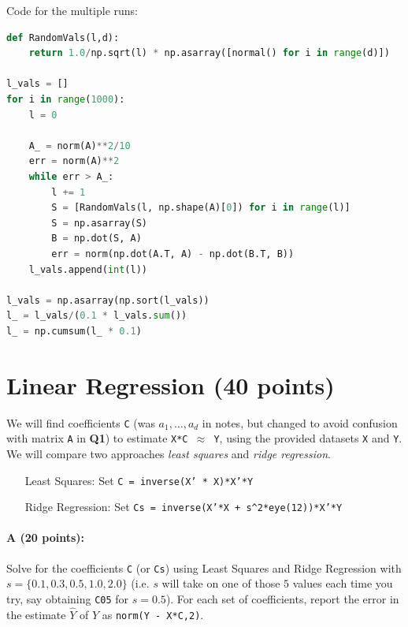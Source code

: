 \documentclass[11pt]{article}
\begin{document}
Code for the multiple runs: 

\begin{lstlisting}[language=Python]
def RandomVals(l,d):
    return 1.0/np.sqrt(l) * np.asarray([normal() for i in range(d)])

l_vals = []
for i in range(1000):
    l = 0

    A_ = norm(A)**2/10
    err = norm(A)**2
    while err > A_:
        l += 1
        S = [RandomVals(l, np.shape(A)[0]) for i in range(l)]    
        S = np.asarray(S)
        B = np.dot(S, A)
        err = norm(np.dot(A.T, A) - np.dot(B.T, B))
    l_vals.append(int(l))

l_vals = np.asarray(np.sort(l_vals))
l_ = l_vals/(0.1 * l_vals.sum())
l_ = np.cumsum(l_ * 0.1)
\end{lstlisting}


\section{Linear Regression (40 points)}

We will find coefficients \texttt{C} (was $a_1, \ldots, a_d$ in notes, but changed to avoid confusion with matrix \texttt{A} in {\bf{\sffamily Q1}}) to estimate \texttt{X*C $\approx$ Y}, using the provided datasets \texttt{X} and \texttt{Y}.  We will compare two approaches \emph{least squares} and \emph{ridge regression}.  

\begin{itemize} \denselist
\item[\textsf{Least Squares:} ]  Set \texttt{C = inverse(X' * X)*X'*Y}
\item[\textsf{Ridge Regression:} ] Set \texttt{Cs = inverse(X'*X + s\^{}2*eye(12))*X'*Y}
\end{itemize}

\paragraph{A (20 points): }
Solve for the coefficients \texttt{C} (or \texttt{Cs}) using Least Squares and Ridge Regression with $s = \{0.1, 0.3, 0.5, 1.0, 2.0\}$ (i.e. $s$ will take on one of those $5$ values each time you try, say obtaining \texttt{C05} for $s=0.5$).  
For each set of coefficients, report the error in the estimate $\hat{Y}$ of $Y$ as 
\texttt{norm(Y - X*C,2)}.
\end{document}
